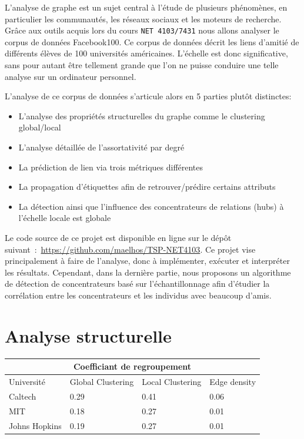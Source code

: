 \documentclass{article}
\begin{document}
L'analyse de graphe est un sujet central à l'étude de plusieurs phénomènes, en particulier les communautés, les réseaux sociaux et les moteurs de recherche.
Grâce aux outils acquis lors du cours \texttt{NET 4103/7431} nous allons analyser le corpus de données Facebook100. Ce corpus de données décrit les liens d'amitié de différents élèves de 100 universités américaines.
L'échelle est donc significative, sans pour autant être tellement grande que l'on ne puisse conduire une telle analyse sur un ordinateur personnel.

L'analyse de ce corpus de données s'articule alors en 5 parties plutôt distinctes:

\begin{itemize}
    \item L'analyse des propriétés structurelles du graphe comme le clustering global/local
    \item L'analyse détaillée de l'assortativité par degré
    \item La prédiction de lien via trois métriques différentes
    \item La propagation d'étiquettes afin de retrouver/prédire certains attributs
    \item La détection ainsi que l'influence des concentrateurs de relations (hubs) à l'échelle locale est globale
\end{itemize}

Le code source de ce projet est disponible en ligne sur le dépôt suivant :~\url{https://github.com/maelhos/TSP-NET4103}.
Ce projet vise principalement à faire de l'analyse, donc à implémenter, exécuter et interpréter les résultats.
Cependant, dans la dernière partie, nous proposons un algorithme de détection de concentrateurs basé sur l'échantillonnage afin d'étudier la corrélation entre les concentrateurs et les individus avec beaucoup d'amis.

\section{Analyse structurelle}

\begin{tabular}{ |p{3.2cm}||p{3.2cm}|p{3.2cm}|p{3.2cm}|  }
    \hline
    \multicolumn{4}{|c|}{Coefficiant de regroupement} \\
    \hline
    Université & Global Clustering & Local Clustering & Edge density \\
    \hline
    Caltech & 0.29 & 0.41 & 0.06\\
    MIT& 0.18 & 0.27 & 0.01\\
    Johns Hopkins & 0.19 & 0.27 & 0.01\\
    \hline
\end{tabular}
\end{document}
